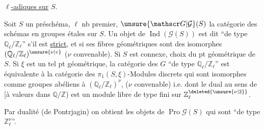\uline{ $\ell$-adiques sur} $S$.

Soit $S$ un préschéma, $\ell$ nb premier,   $\unsure{\mathscr G|\mathcal G}(S)$ la catégorie des schémas en groupes  étales sur $S$. Un objet de $\operatorname{Ind}(\mathscr G(S))$ est dit ``de type $\mathbb Q_\ell/\mathbb Z_\ell$'' s'il est \uline{strict}, et si ses fibres géométriques sont des  isomorphes  $(\mathbb Q_\ell/\mathbb Z_\ell)^{\unsure{\nu|v}}$ ($\nu$ convenable). Si $S$ est connexe,   choix du pt géométrique de $S$. Si $\xi$ est un tel pt géométrique, la  catégorie des  $G$ ``de type $\mathbb Q_\ell/\mathbb Z_\ell$'' est  équivalente à la catégorie des \deleted{\unsure{$\xi$}} $\pi_1(S,\xi)$-Modules discrets qui sont isomorphes comme groupes abéliens à $(\mathbb Q_\ell/\mathbb Z_\ell)^\nu$,  ($\nu$ convenable) i.e. dont le dual au sens de  [à valeurs dans $\mathbb Q/\mathbb Z$) est  un module libre de type fini sur $\mathbb Z_\ell^{\deleted{\unsure{\nu|2}}}$.

Par dualité (de Pontrjagin) on obtient les objets de $\operatorname{Pro}\mathscr G(S)$ qui sont ``de type $\mathbb Z_\ell^\nu$''.

